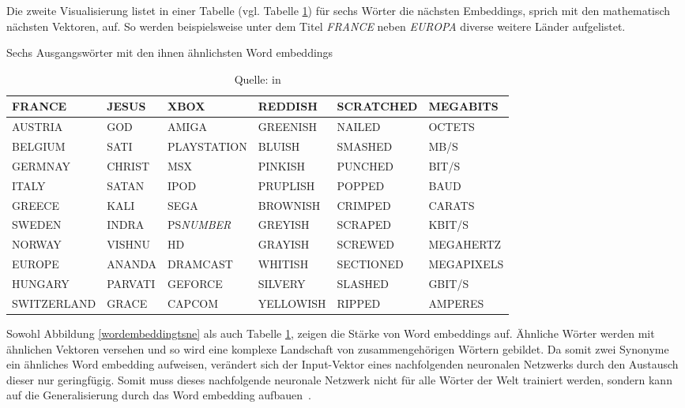 Die zweite Visualisierung listet in einer Tabelle (vgl. Tabelle \ref{wordembeddingtable}) für sechs Wörter die nächsten Embeddings, sprich mit den mathematisch nächsten Vektoren, auf. So werden beispielsweise unter dem Titel \textit{FRANCE} neben \textit{EUROPA} diverse weitere Länder aufgelistet.
\begin{table}[h!]
\centering
    \captionsetup{width=.9\linewidth}
    \caption{Sechs Ausgangswörter mit den ihnen ähnlichsten Word embeddings}
    \label{wordembeddingtable}
    \renewcommand{\arraystretch}{1.25}
    \setlength{\tabcolsep}{3pt}
    \footnotesize
    \begin{tabular}{ | l | l | l | l | l | l |}
    \hline
    \rowcolor[HTML]{C0E5FD} FRANCE & JESUS & XBOX & REDDISH & SCRATCHED & MEGABITS \\ \hline
    AUSTRIA & GOD & AMIGA & GREENISH & NAILED & OCTETS \\ \hline
    BELGIUM & SATI & PLAYSTATION & BLUISH & SMASHED & MB/S \\ \hline
    GERMNAY& CHRIST & MSX & PINKISH & PUNCHED & BIT/S \\ \hline
    ITALY & SATAN & IPOD & PRUPLISH & POPPED & BAUD \\ \hline
    GREECE & KALI & SEGA & BROWNISH & CRIMPED & CARATS \\ \hline
    SWEDEN & INDRA & PS\textit{NUMBER} & GREYISH & SCRAPED & KBIT/S \\ \hline
    NORWAY & VISHNU & HD & GRAYISH & SCREWED & MEGAHERTZ \\ \hline
    EUROPE & ANANDA & DRAMCAST & WHITISH & SECTIONED & MEGAPIXELS \\ \hline
    HUNGARY & PARVATI & GEFORCE & SILVERY & SLASHED & GBIT/S \\ \hline
    SWITZERLAND & GRACE & CAPCOM & YELLOWISH & RIPPED & AMPERES \\ \hline
    \end{tabular}
    \caption*{Quelle: \textcite{Collobert2011} in \textcite{Olah2014b}}
\end{table}

Sowohl Abbildung \ref{wordembeddingtsne} als auch Tabelle \ref{wordembeddingtable}, zeigen die Stärke von Word embeddings auf. Ähnliche Wörter werden mit ähnlichen Vektoren versehen und so wird eine komplexe Landschaft von zusammengehörigen Wörtern gebildet. Da somit zwei Synonyme ein ähnliches Word embedding aufweisen, verändert sich der Input-Vektor eines nachfolgenden neuronalen Netzwerks durch den Austausch dieser nur geringfügig. Somit muss dieses nachfolgende neuronale Netzwerk nicht für alle Wörter der Welt trainiert werden, sondern kann auf die Generalisierung durch das Word embedding aufbauen~\autocite{Olah2014b}.

